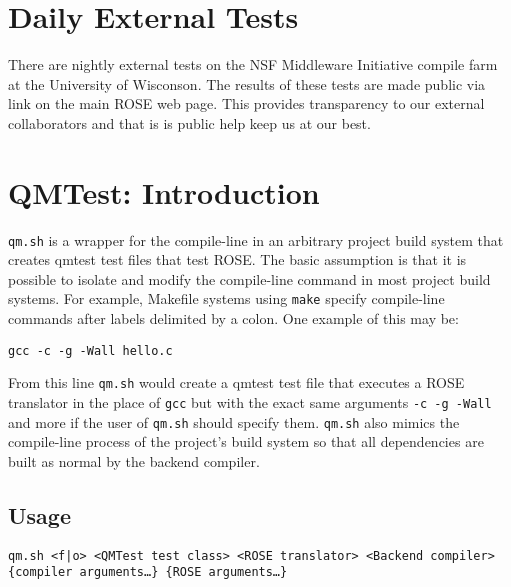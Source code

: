 \section{Daily External Tests}
\label{testing::dailyExternalTests}
   There are nightly external tests on the NSF Middleware Initiative compile farm
at the University of Wisconson. The results of these tests are made public
via link on the main ROSE web page.  This provides transparency to our external
collaborators and that is is public help keep us at our best.




{\scriptsize  }

\section{QMTest: Introduction}
{\tt qm.sh} is a wrapper for the compile-line in an arbitrary project build 
system that creates qmtest test files that test ROSE. The basic assumption
is that it is possible to isolate and modify the compile-line command in most
project build systems. For example, Makefile systems using {\tt make} specify
compile-line commands after labels delimited by a colon. One example of this
may be:

\begin{center}
  {\tt gcc -c -g -Wall hello.c}
\end{center}
From this line {\tt qm.sh} would create a qmtest test file that executes
a ROSE translator in the place of {\tt gcc} but with the exact same arguments
{\tt -c -g -Wall} and more if the user of {\tt qm.sh} should specify them.
{\tt qm.sh} also mimics the compile-line process of the project's build system
so that all dependencies are built as normal by the backend compiler.

\subsection{Usage}

{\tt qm.sh <f|o> <QMTest test class> <ROSE translator> <Backend compiler> 
\{compiler arguments\ldots\} \{ROSE arguments\ldots\}}

